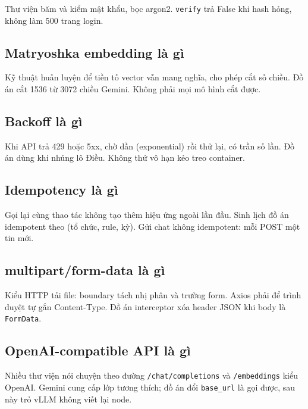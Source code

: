 Thư viện băm và kiểm mật khẩu, bọc argon2. \texttt{verify} trả False khi hash
hỏng, không làm 500 trang login.

\subsection{Matryoshka embedding là gì}

Kỹ thuật huấn luyện để tiền tố vector vẫn mang nghĩa, cho phép cắt số chiều.
Đồ án cắt 1536 từ 3072 chiều Gemini. Không phải mọi mô hình cắt được.

\subsection{Backoff là gì}

Khi API trả 429 hoặc 5xx, chờ dần (exponential) rồi thử lại, có trần số lần.
Đồ án dùng khi nhúng lô Điều. Không thử vô hạn kẻo treo container.

\subsection{Idempotency là gì}

Gọi lại cùng thao tác không tạo thêm hiệu ứng ngoài lần đầu. Sinh lịch đồ án
idempotent theo (tổ chức, rule, kỳ). Gửi chat không idempotent: mỗi POST một
tin mới.

\subsection{multipart/form-data là gì}

Kiểu HTTP tải file: boundary tách nhị phân và trường form. Axios phải để trình
duyệt tự gắn Content-Type. Đồ án interceptor xóa header JSON khi body là
\texttt{FormData}.

\subsection{OpenAI-compatible API là gì}

Nhiều thư viện nói chuyện theo đường \texttt{/chat/completions} và
\texttt{/embeddings} kiểu OpenAI. Gemini cung cấp lớp tương thích; đồ án đổi
\texttt{base\_url} là gọi được, sau này trỏ vLLM không viết lại node.
